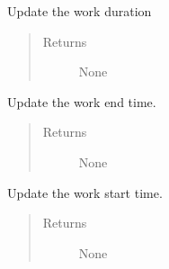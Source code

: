 \documentclass[letterpaper,10pt,english]{sphinxmanual}
\begin{document}
\begin{fulllineitems}
\begin{fulllineitems}
\begin{quote}
\begin{description}
\end{description}\end{quote}

\end{fulllineitems}


\begin{fulllineitems}
\label{occupation:occupation.Occupation.update_work_dt}
Update the work duration
\begin{quote}\begin{description}
\item[{Returns}] \leavevmode
None

\end{description}\end{quote}

\end{fulllineitems}


\begin{fulllineitems}
\label{occupation:occupation.Occupation.update_work_end}
Update the work end time.
\begin{quote}\begin{description}
\item[{Returns}] \leavevmode
None

\end{description}\end{quote}

\end{fulllineitems}


\begin{fulllineitems}
\label{occupation:occupation.Occupation.update_work_start}
Update the work start time.
\begin{quote}\begin{description}
\item[{Returns}] \leavevmode
None

\end{description}\end{quote}

\end{fulllineitems}


\end{fulllineitems}
\end{document}
